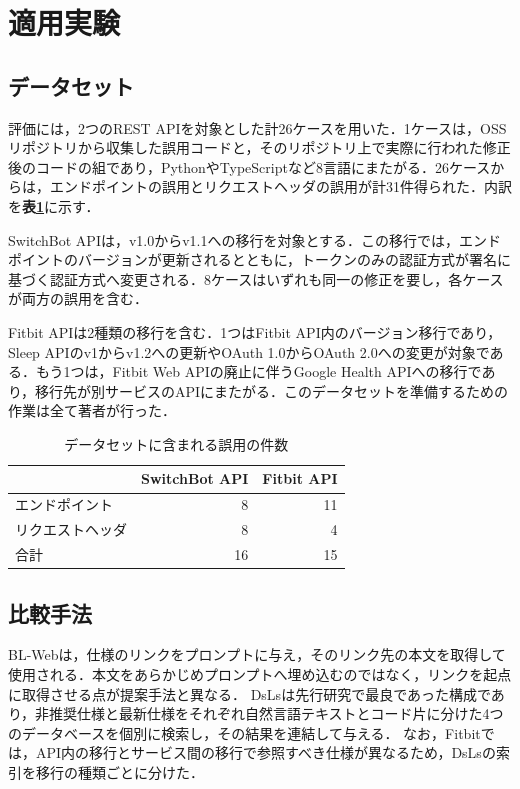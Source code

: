 \section{適用実験}

\subsection{データセット}
評価には，2つのREST APIを対象とした計26ケースを用いた．1ケースは，OSSリポジトリから収集した誤用コードと，そのリポジトリ上で実際に行われた修正後のコードの組であり，PythonやTypeScriptなど8言語にまたがる．26ケースからは，エンドポイントの誤用とリクエストヘッダの誤用が計31件得られた．内訳を\textbf{表\ref{tab:dataset}}に示す．

SwitchBot APIは，v1.0からv1.1への移行を対象とする．この移行では，エンドポイントのバージョンが更新されるとともに，トークンのみの認証方式が署名に基づく認証方式へ変更される．8ケースはいずれも同一の修正を要し，各ケースが両方の誤用を含む．

Fitbit APIは2種類の移行を含む．1つはFitbit API内のバージョン移行であり，Sleep APIのv1からv1.2への更新やOAuth 1.0からOAuth 2.0への変更が対象である．もう1つは，Fitbit Web APIの廃止に伴うGoogle Health APIへの移行であり，移行先が別サービスのAPIにまたがる．このデータセットを準備するための作業は全て著者が行った．

\begin{table}[t]
\centering
\caption{データセットに含まれる誤用の件数}
\label{tab:dataset}
\small
\begin{tabular}{l|rr}
\hline\hline
 & SwitchBot API & Fitbit API \\
\hline
エンドポイント & 8 & 11 \\
リクエストヘッダ & 8 & 4 \\
\hline
合計 & 16 & 15 \\
\hline
\end{tabular}
\end{table}

\subsection{比較手法}

BL-Webは，仕様のリンクをプロンプトに与え，そのリンク先の本文を取得して使用される．本文をあらかじめプロンプトへ埋め込むのではなく，リンクを起点に取得させる点が提案手法と異なる．
DsLsは先行研究\cite{inoue2025dbrag}で最良であった構成であり，非推奨仕様と最新仕様をそれぞれ自然言語テキストとコード片に分けた4つのデータベースを個別に検索し，その結果を連結して与える．
なお，Fitbitでは，API内の移行とサービス間の移行で参照すべき仕様が異なるため，DsLsの索引を移行の種類ごとに分けた．


